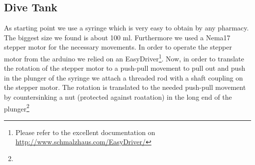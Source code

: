 \documentclass{tufte-handout}
\begin{document}
\subsection{Dive Tank}
As starting point we use a syringe which is very easy to obtain by any
pharmacy. The biggest size we found is about 100 ml. Furthermore we used a
Nema17 stepper motor for the necessary movements. In order to operate the
stepper motor from the arduino we relied on an EasyDriver\footnote{Please refer
to the excellent documentation on
\url{http://www.schmalzhaus.com/EasyDriver/}}.
Now, in order to translate the rotation of the stepper motor to a push-pull
movement to pull out and push in the plunger of the syringe we attach a
threaded rod with a shaft coupling on the stepper motor. The rotation is
translated to the needed push-pull movement by countersinking a nut (protected
against roatation) in the long end of the plunger\footnote{\centering
}
\end{document}
